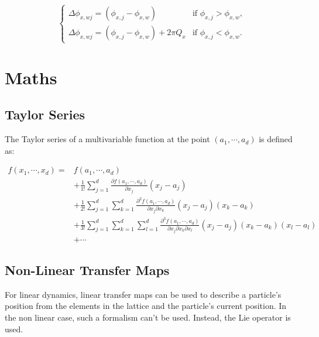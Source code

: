 \begin{equation}
\begin{cases} 
  \Delta \phi_{x,wj} = \left(\phi_{x,j} - \phi_{x,w} \right)              & \mbox{if } \phi_{x,j} > \phi_{x,w}, \\
  \Delta \phi_{x,wj} = \left(\phi_{x,j} - \phi_{x,w} \right) + 2 \pi Q_x  & \mbox{if } \phi_{x,j} < \phi_{x,w}.
\end{cases}
\end{equation}

\newpage

\hypertarget{maths}{%
\section{Maths}\label{maths}}

\hypertarget{taylor-series}{%
\subsection{Taylor Series}\label{taylor-series}}

The Taylor series of a multivariable function at the point
\((a_1, \cdots, a_d)\) is defined as:

\begin{equation}\begin{aligned}
  f(x_1, \cdots, x_d) = &f(a_1, \cdots, a_d) \\
                &+ \frac{1}{1!} \sum_{j=1}^{d} \frac{\partial f(a_1, \cdots, a_d)}{\partial x_j} (x_j - a_j) \\
                &+ \frac{1}{2!}\sum_{j=1}^{d}\sum_{k=1}^{d} \frac{\partial^2 f(a_1, \cdots, a_d)}{\partial x_j\partial x_k} (x_j - a_j) (x_k - a_k) \\
                &+ \frac{1}{3!}\sum_{j=1}^{d}\sum_{k=1}^{d}\sum_{l=1}^{d} \frac{\partial^3 f(a_1, \cdots, a_d)}{\partial x_j\partial x_k\partial x_l} (x_j - a_j) (x_k - a_k) (x_l - a_l)\\
                &+ \cdots
\end{aligned}\label{eq:taylor}\end{equation}

\hypertarget{non-linear-transfer-maps}{%
\subsection{Non-Linear Transfer Maps}\label{non-linear-transfer-maps}}

For linear dynamics, linear transfer maps can be used to describe a
particle's position from the elements in the lattice and the particle's
current position. In the non linear case, such a formalism can't be
used. Instead, the Lie operator is used.


